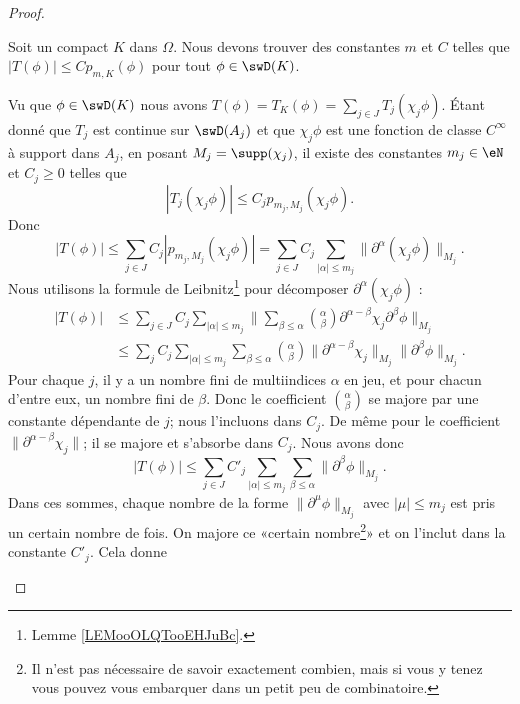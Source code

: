 \begin{proof}
\begin{subproof}
		Soit un compact \( K\) dans \( \Omega\). Nous devons trouver des constantes \( m\) et \( C\) telles que \( |T(\phi)|\leq Cp_{m,K}(\phi)\) pour tout \( \phi\in \swD(K)\).

		Vu que \( \phi\in \swD(K)\) nous avons \( T(\phi)=T_K(\phi)=\sum_{j\in J}T_j(\chi_j\phi)\). Étant donné que \( T_j\) est continue sur \( \swD(A_j)\) et que \( \chi_j\phi\) est une fonction de classe \(  C^{\infty}\) à support dans \( A_j\), en posant \( M_j=\supp(\chi_j)\), il existe des constantes \( m_j\in \eN\) et \( C_j\geq 0\) telles que
		\begin{equation}
			| T_j(\chi_j\phi) |\leq C_jp_{m_j,M_j}(\chi_j\phi).
		\end{equation}
		Donc
		\begin{equation}
			| T(\phi) |\leq \sum_{j\in J}C_j| p_{m_j,M_j}(\chi_j\phi) |=\sum_{j\in J}C_j\sum_{| \alpha |\leq m_j}\| \partial^{\alpha}(\chi_j\phi) \|_{M_j}.
		\end{equation}
		Nous utilisons la formule de Leibnitz\footnote{Lemme \ref{LEMooOLQTooEHJuBc}.} pour décomposer \( \partial^{\alpha}(\chi_j\phi)\) :
		\begin{subequations}
			\begin{align}
				| T(\phi) | & \leq\sum_{j\in J}C_j\sum_{| \alpha |\leq m_j}\| \sum_{\beta\leq \alpha}\binom{ \alpha }{ \beta }\partial^{\alpha-\beta}\chi_j\partial^{\beta}\phi \|_{M_j}        \\
				            & \leq \sum_jC_j\sum_{| \alpha |\leq m_j}\sum_{\beta\leq \alpha}\binom{ \alpha }{ \beta }\| \partial^{\alpha-\beta}\chi_j \|_{M_j}\| \partial^{\beta}\phi \|_{M_j}.
			\end{align}
		\end{subequations}
		Pour chaque \( j\), il y a un nombre fini de multiindices \( \alpha\) en jeu, et pour chacun d'entre eux, un nombre fini de \( \beta\). Donc le coefficient \( \binom{ \alpha }{ \beta }\) se majore par une constante dépendante de \( j\); nous l'incluons dans \( C_j\). De même pour le coefficient \( \| \partial^{\alpha-\beta}\chi_j \|\); il se majore et s'absorbe dans \( C_j\). Nous avons donc
		\begin{equation}
			| T(\phi) |\leq \sum_{j\in J}C'_j\sum_{| \alpha |\leq m_j}\sum_{\beta\leq \alpha}\| \partial^{\beta}\phi \|_{M_j}.
		\end{equation}
		Dans ces sommes, chaque nombre de la forme \( \| \partial^{\mu}\phi \|_{M_j}\) avec \( | \mu |\leq m_j\) est pris un certain nombre de fois. On majore ce «certain nombre\footnote{Il n'est pas nécessaire de savoir exactement combien, mais si vous y tenez vous pouvez vous embarquer dans un petit peu de combinatoire.}» et on l'inclut dans la constante \( C'_j\). Cela donne

\end{subproof}
\end{proof}
